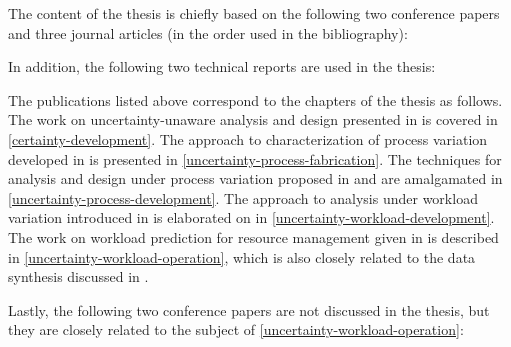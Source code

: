 The content of the thesis is chiefly based on the following two conference
papers and three journal articles (in the order used in the bibliography):

\printbibliography[heading=none,keyword=own]

In addition, the following two technical reports are used in the thesis:

\printbibliography[heading=none,keyword=own-unpublished]

The publications listed above correspond to the chapters of the thesis as
follows. The work on uncertainty-unaware analysis and design presented in
\cite{ukhov2012} is covered in \cref{certainty-development}. The approach to
characterization of process variation developed in \cite{ukhov2014a} is
presented in \cref{uncertainty-process-fabrication}. The techniques for analysis
and design under process variation proposed in \cite{ukhov2014b} and
\cite{ukhov2015} are amalgamated in \cref{uncertainty-process-development}. The
approach to analysis under workload variation introduced in \cite{ukhov2017a} is
elaborated on in \cref{uncertainty-workload-development}. The work on workload
prediction for resource management given in \cite{ukhov2017b} is described in
\cref{uncertainty-workload-operation}, which is also closely related to the data
synthesis discussed in \cite{ukhov2017c}.

\nocite{niknafs2017a, niknafs2017b}
Lastly, the following two conference papers are not discussed in the thesis, but
they are closely related to the subject of
\cref{uncertainty-workload-operation}:

\printbibliography[heading=none,keyword=own-secondary]
